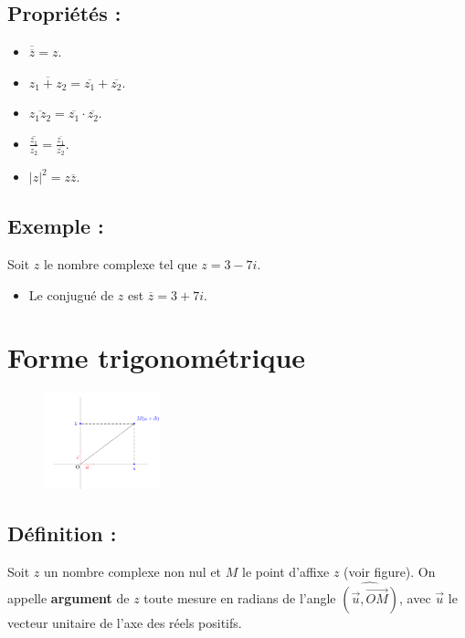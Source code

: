 \documentclass[a4paper,12pt]{article}
\begin{document}
    \subsection{Propriétés :}
    \begin{itemize}
        \item $\overline{\overline{z}} = z$.
        \item $\overline{z_1 + z_2} = \overline{z_1} + \overline{z_2}$.
        \item $\overline{z_1 z_2} = \overline{z_1} \cdot \overline{z_2}$.
        \item $\overline{\frac{z_1}{z_2}} = \frac{\overline{z_1}}{\overline{z_2}}$.
        \item $|z|^2 = z\overline{z}$.
    \end{itemize}
    \subsection{Exemple :}

    Soit $z$ le nombre complexe tel que $z = 3 - 7i$.

    \begin{itemize}
        \item Le conjugué de $z$ est $\overline{z} = 3 + 7i$.
    \end{itemize}

    \section{Forme trigonométrique}
    \begin{figure}[h]
        \centering
        \includegraphics[width=0.3\textwidth]{formealgebrique.png}
        \label{fig:formealgebrique}
    \end{figure}
    \subsection{Définition :}
    Soit $z$ un nombre complexe non nul et $M$ le point d’affixe $z$ (voir figure). On appelle \textbf{argument} de $z$ toute mesure en radians de l’angle $\widehat{(\vec{u}, \vec{OM})}$, avec $\vec{u}$ le vecteur unitaire de l’axe des réels positifs.
\end{document}
